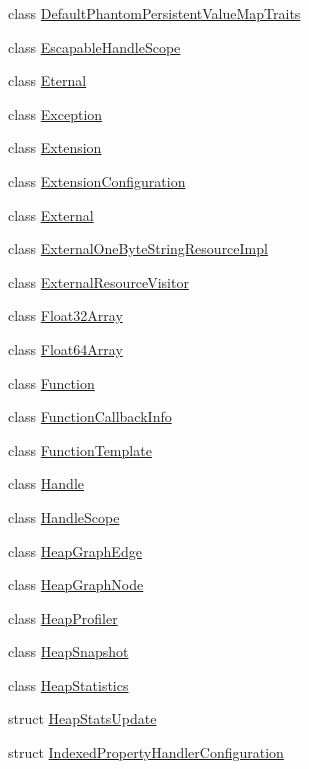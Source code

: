 \begin{DoxyCompactItemize}
class \hyperlink{classv8_1_1_default_phantom_persistent_value_map_traits}{Default\+Phantom\+Persistent\+Value\+Map\+Traits}
\item 
class \hyperlink{classv8_1_1_escapable_handle_scope}{Escapable\+Handle\+Scope}
\item 
class \hyperlink{classv8_1_1_eternal}{Eternal}
\item 
class \hyperlink{classv8_1_1_exception}{Exception}
\item 
class \hyperlink{classv8_1_1_extension}{Extension}
\item 
class \hyperlink{classv8_1_1_extension_configuration}{Extension\+Configuration}
\item 
class \hyperlink{classv8_1_1_external}{External}
\item 
class \hyperlink{classv8_1_1_external_one_byte_string_resource_impl}{External\+One\+Byte\+String\+Resource\+Impl}
\item 
class \hyperlink{classv8_1_1_external_resource_visitor}{External\+Resource\+Visitor}
\item 
class \hyperlink{classv8_1_1_float32_array}{Float32\+Array}
\item 
class \hyperlink{classv8_1_1_float64_array}{Float64\+Array}
\item 
class \hyperlink{classv8_1_1_function}{Function}
\item 
class \hyperlink{classv8_1_1_function_callback_info}{Function\+Callback\+Info}
\item 
class \hyperlink{classv8_1_1_function_template}{Function\+Template}
\item 
class \hyperlink{classv8_1_1_handle}{Handle}
\item 
class \hyperlink{classv8_1_1_handle_scope}{Handle\+Scope}
\item 
class \hyperlink{classv8_1_1_heap_graph_edge}{Heap\+Graph\+Edge}
\item 
class \hyperlink{classv8_1_1_heap_graph_node}{Heap\+Graph\+Node}
\item 
class \hyperlink{classv8_1_1_heap_profiler}{Heap\+Profiler}
\item 
class \hyperlink{classv8_1_1_heap_snapshot}{Heap\+Snapshot}
\item 
class \hyperlink{classv8_1_1_heap_statistics}{Heap\+Statistics}
\item 
struct \hyperlink{structv8_1_1_heap_stats_update}{Heap\+Stats\+Update}
\item 
struct \hyperlink{structv8_1_1_indexed_property_handler_configuration}{Indexed\+Property\+Handler\+Configuration}

\end{DoxyCompactItemize}
